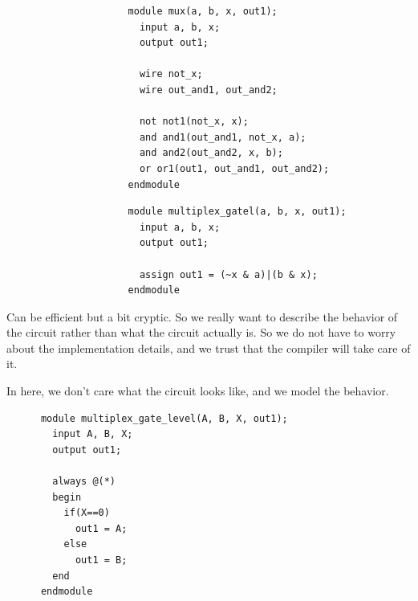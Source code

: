   \begin{definition}
    \begin{figure}[H]
      \centering
      \begin{subfigure}[b]{0.48\textwidth}
        \centering
        \begin{lstlisting}
          module mux(a, b, x, out1); 
            input a, b, x; 
            output out1; 

            wire not_x; 
            wire out_and1, out_and2; 

            not not1(not_x, x); 
            and and1(out_and1, not_x, a); 
            and and2(out_and2, x, b); 
            or or1(out1, out_and1, out_and2); 
          endmodule
        \end{lstlisting}
        \caption{}
      \end{subfigure}
      \hfill 
      \begin{subfigure}[b]{0.48\textwidth}
        \centering
        \begin{lstlisting}
          module multiplex_gatel(a, b, x, out1); 
            input a, b, x; 
            output out1; 

            assign out1 = (~x & a)|(b & x);
          endmodule
        \end{lstlisting}
        \caption{}
      \end{subfigure}
      \caption{}
    \end{figure}
  \end{definition}

  Can be efficient but a bit cryptic. So we really want to describe the behavior of the circuit rather than what the circuit actually is. So we do not have to worry about the implementation details, and we trust that the compiler will take care of it. 

  \begin{example}
    In here, we don't care what the circuit looks like, and we model the behavior. 
    \begin{lstlisting}
      module multiplex_gate_level(A, B, X, out1); 
        input A, B, X; 
        output out1; 

        always @(*)
        begin
          if(X==0) 
            out1 = A; 
          else 
            out1 = B; 
        end
      endmodule
    \end{lstlisting}
  \end{example}

